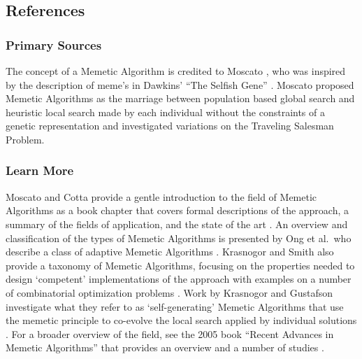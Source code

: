 

\subsection{References}

% 
% 
\subsubsection{Primary Sources}
The concept of a Memetic Algorithm is credited to Moscato \cite{Moscato1989}, who was inspired by the description of meme's in Dawkins' ``The Selfish Gene'' \cite{Dawkins1976}. Moscato proposed Memetic Algorithms as the marriage between population based global search and heuristic local search made by each individual without the constraints of a genetic representation and investigated variations on the Traveling Salesman Problem.

% 
% 
\subsubsection{Learn More}
Moscato and Cotta provide a gentle introduction to the field of Memetic Algorithms as a book chapter that covers formal descriptions of the approach, a summary of the fields of application, and the state of the art \cite{Moscato2003}.
An overview and classification of the types of Memetic Algorithms is presented by Ong et al.\ who describe a class of adaptive Memetic Algorithms \cite{Ong2006}. Krasnogor and Smith also provide a taxonomy of Memetic Algorithms, focusing on the properties needed to design `competent' implementations of the approach with examples on a number of combinatorial optimization problems \cite{Krasnogor2005}. Work by Krasnogor and Gustafson investigate what they refer to as `self-generating' Memetic Algorithms that use the memetic principle to co-evolve the local search applied by individual solutions \cite{Krasnogor2004}. 
For a broader overview of the field, see the 2005 book ``Recent Advances in Memetic Algorithms'' that provides an overview and a number of studies \cite{Hart2005}.


